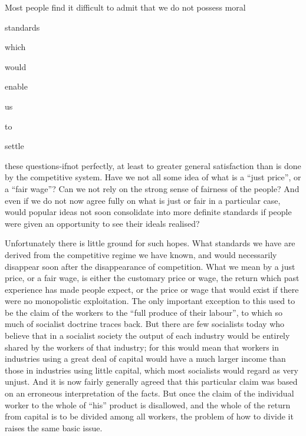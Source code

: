 \documentclass[11pt,openany]{book}
\begin{document}
\begin{center}\textasteriskcentered\hspace{0.9em}\textasteriskcentered\hspace{0.9em}\textasteriskcentered\end{center}

Most people find it difficult to admit that we do not possess moral

standards

which

would

enable

us

to

settle

these questions-ifnot perfectly, at least to greater general satisfaction than is done by the competitive system. Have we not all some idea of what is a ``just price'', or a ``fair wage''? Can we not rely on the strong sense of fairness of the people? And even if we do not now agree fully on what is just or fair in a particular case, would popular ideas not soon consolidate into more definite standards if people were given an opportunity to see their ideals realised?

Unfortunately there is little ground for such hopes. What standards we have are derived from the competitive regime we have known, and would necessarily disappear soon after the disappearance of competition. What we mean by a just price, or a fair wage, is either the customary price or wage, the return which past experience has made people expect, or the price or wage that would exist if there were no monopolistic exploitation. The only important exception to this used to be the claim of the workers to the ``full produce of their labour'', to which so much of socialist doctrine traces back. But there are few socialists today who believe that in a socialist society the output of each industry would be entirely shared by the workers of that industry; for this would mean that workers in industries using a great deal of capital would have a much larger income than those in industries using little capital, which most socialists would regard as very unjust. And it is now fairly generally agreed that this particular claim was based on an erroneous interpretation of the facts. But once the claim of the individual worker to the whole of ``his'' product is disallowed, and the whole of the return from capital is to be divided among all workers, the problem of how to divide it raises the same basic issue.
\end{document}
